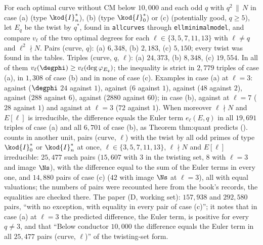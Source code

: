 \begin{sloppypar}
\begin{example}\label{ex:computation:repro-twist}
For each optimal curve without CM below $10{,}000$ and each odd $q$ with $q^2\,\|\,N$ in case (a) (type $\kod{I}_n^*$), (b) (type $\kod{I}_0^*$) or (c) (potentially good, $q\ge5$),
let $E_q$ be the twist by $q^*$, found in \texttt{allcurves} through \texttt{ellminimalmodel}, and compare $v_\ell$ of the two optimal degrees for each
$\ell\in\{3,5,7,11,13\}$ with $\ell\ne q$ and $\ell^2\nmid N$. Pairs (curve, $q$): (a) $6{,}348$, (b) $2{,}183$, (c) $5{,}150$; every twist was found in the tables.
Triples (curve, $q$, $\ell$): (a) $24{,}373$, (b) $8{,}348$, (c) $19{,}554$. In all of them $v_\ell(\degphi)\ge v_\ell(\deg\varphi_{E_q})$; the inequality is strict in $2{,}779$
triples of case (a), in $1{,}308$ of case (b) and in none of case (c). Examples in case (a) at $\ell=3$:  against  ($\degphi$ $24$ against $1$),
 against  ($6$ against $1$),  against  ($48$ against $2$),  against  ($288$ against $6$),
 against  ($2880$ against $60$); in case (b),  against  at $\ell=7$ ($28$ against $1$) and  against  at
$\ell=3$ ($72$ against $1$). When moreover $\ell\nmid N$ and $E[\ell]$ is irreducible, the difference equals the Euler term $e_\ell(E,q)$ in all $19{,}691$ triples of case (a)
and all $6{,}701$ of case (b), as Theorem thm:quant predicts ().  counts in another unit, pairs (curve, $\ell$) with the twist by all
odd primes of type $\kod{I}_0^*$ or $\kod{I}_n^*$ at once, $\ell\in\{3,5,7,11,13\}$, $\ell\nmid N$ and $E[\ell]$ irreducible: $25{,}477$ such pairs ($15{,}607$ with $3$ in
the twisting set, $8$ with $\ell=3$ and image $\Ns$), with the difference equal to the sum of the Euler terms in every one, and $14{,}880$ pairs of case (c)
($42$ with image $\Ns$ at $\ell=3$), all with equal valuations; the numbers of pairs were recounted here from the book's records, the equalities are checked there. The paper (D, working set): $157{,}938$ and $292{,}580$ pairs, ``with no exception,
with equality in every pair of case (c)''; it notes that in case (a) at $\ell=3$ the predicted difference, the Euler term, is positive for every
$q\ne3$, and that ``Below conductor $10{,}000$ the difference equals the Euler term in all $25{,}477$ pairs (curve, $\ell$)'' of the twisting-set form.
\end{example}


\end{sloppypar}
